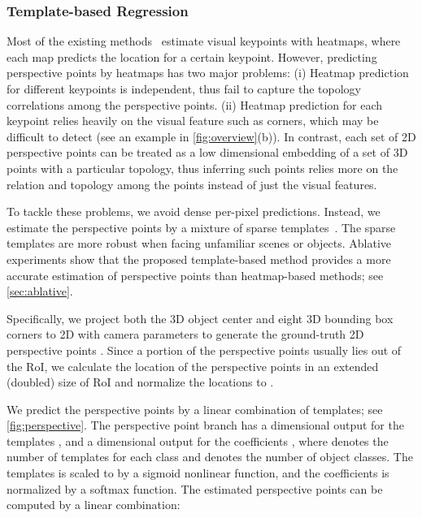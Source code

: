 \documentclass{article}
\begin{document}
\subsubsection{Template-based Regression}

Most of the existing methods~\cite{newell2016stacked,lee2017roomnet,zou2018layoutnet,he2017mask,suwajanakorn2018discovery} estimate visual keypoints with heatmaps, where each map predicts the location for a certain keypoint. However, predicting perspective points by heatmaps has two major problems: (i) Heatmap prediction for different keypoints is independent, thus fail to capture the topology correlations among the perspective points. (ii) Heatmap prediction for each keypoint relies heavily on the visual feature such as corners, which may be difficult to detect (see an example in \autoref{fig:overview}(b)). In contrast, each set of 2D perspective points can be treated as a low dimensional embedding of a set of 3D points with a particular topology, thus inferring such points relies more on the relation and topology among the points instead of just the visual features.

To tackle these problems, we avoid dense per-pixel predictions. Instead, we estimate the perspective points by a mixture of sparse templates~\cite{olshausen1996emergence,wu2010learning}. The sparse templates are more robust when facing unfamiliar scenes or objects. Ablative experiments show that the proposed template-based method provides a more accurate estimation of perspective points than heatmap-based methods; see \autoref{sec:ablative}.

Specifically, we project both the 3D object center and eight 3D bounding box corners to 2D with camera parameters to generate the ground-truth 2D perspective points . Since a portion of the perspective points usually lies out of the RoI, we calculate the location of the perspective points in an extended (doubled) size of RoI and normalize the locations to .

We predict the perspective points by a linear combination of templates; see \autoref{fig:perspective}. The perspective point branch has a  dimensional output for the templates , and a  dimensional output for the coefficients , where  denotes the number of templates for each class and  denotes the number of object classes. The templates  is scaled to  by a sigmoid nonlinear function, and the coefficients  is normalized by a softmax function. The estimated perspective points  can be computed by a linear combination: 
\end{document}
